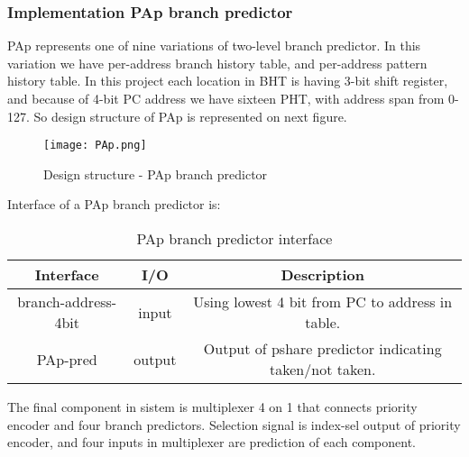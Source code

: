 \documentclass{scrreprt}
\begin{document}
\subsubsection*{Implementation PAp branch predictor}
PAp represents one of nine variations of two-level branch predictor. In this variation we have per-address branch history table, and per-address pattern history table. In this project each location in BHT is having 3-bit shift register, and because of 4-bit PC address we have sixteen PHT, with address span from 0-127. So design structure of PAp is represented on next figure. 
\begin{figure}[htb!]
    \centering
    \texttt{[image: PAp.png]}
    \caption{Design structure - PAp branch predictor}
    \label{fig:PAp}
\end{figure}
\newline
\newline
\newline
\newline
\newline
\newline
Interface of a PAp branch predictor is: 
\begin{table}[htb!]
            \centering
            \begin{tabular}{|c|c|c|} \hline 
             Interface & I/O & Description \\ \hline  
             branch-address-4bit & input & Using lowest 4 bit from PC to address in table. \\ \hline  
             PAp-pred & output & Output of pshare predictor indicating taken/not taken.  \\ \hline
        \end{tabular}
        \caption{PAp branch predictor interface}
        \label{tab:PApI}
    \end{table}
\newline
The final component in sistem is multiplexer 4 on 1 that connects priority encoder and four branch predictors. Selection signal is index-sel output of priority encoder, and four inputs in multiplexer are prediction of each component. 
\newpage
{} 
\end{document}
